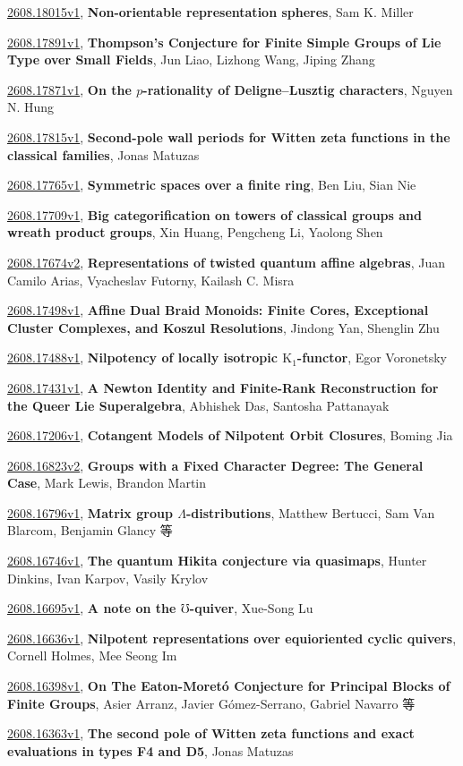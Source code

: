 \documentclass[9pt, a4paper]{article}
\theoremstyle{plain}
\theoremstyle{definition}
\theoremstyle{remark}
\newcommand{\arxiv}[3]{\href{https://arxiv.org/abs/#1}{#1}, \textbf{\textcolor{arxivblue}{#2}}, #3}
\begin{document}
\arxiv{2608.18015v1}{Non-orientable representation spheres}{Sam K. Miller}

\arxiv{2608.17891v1}{Thompson's Conjecture for Finite Simple Groups of Lie Type over Small Fields}{Jun Liao, Lizhong Wang, Jiping Zhang}

\arxiv{2608.17871v1}{On the $p$-rationality of Deligne--Lusztig characters}{Nguyen N. Hung}

\arxiv{2608.17815v1}{Second-pole wall periods for Witten zeta functions in the classical families}{Jonas Matuzas}

\arxiv{2608.17765v1}{Symmetric spaces over a finite ring}{Ben Liu, Sian Nie}

\arxiv{2608.17709v1}{Big categorification on towers of classical groups and wreath product groups}{Xin Huang, Pengcheng Li, Yaolong Shen}

\arxiv{2608.17674v2}{Representations of twisted quantum affine algebras}{Juan Camilo Arias, Vyacheslav Futorny, Kailash C. Misra}

\arxiv{2608.17498v1}{Affine Dual Braid Monoids: Finite Cores, Exceptional Cluster Complexes, and Koszul Resolutions}{Jindong Yan, Shenglin Zhu}

\arxiv{2608.17488v1}{Nilpotency of locally isotropic $ \mathrm{K}_1 $-functor}{Egor Voronetsky}

\arxiv{2608.17431v1}{A Newton Identity and Finite-Rank Reconstruction for the Queer Lie Superalgebra}{Abhishek Das, Santosha Pattanayak}

\arxiv{2608.17206v1}{Cotangent Models of Nilpotent Orbit Closures}{Boming Jia}

\arxiv{2608.16823v2}{Groups with a Fixed Character Degree: The General Case}{Mark Lewis, Brandon Martin}

\arxiv{2608.16796v1}{Matrix group $Λ$-distributions}{Matthew Bertucci, Sam Van Blarcom, Benjamin Glancy 等}

\arxiv{2608.16746v1}{The quantum Hikita conjecture via quasimaps}{Hunter Dinkins, Ivan Karpov, Vasily Krylov}

\arxiv{2608.16695v1}{A note on the $\mho$-quiver}{Xue-Song Lu}

\arxiv{2608.16636v1}{Nilpotent representations over equioriented cyclic quivers}{Cornell Holmes, Mee Seong Im}

\arxiv{2608.16398v1}{On The Eaton-Moretó Conjecture for Principal Blocks of Finite Groups}{Asier Arranz, Javier Gómez-Serrano, Gabriel Navarro 等}

\arxiv{2608.16363v1}{The second pole of Witten zeta functions and exact evaluations in types F4 and D5}{Jonas Matuzas}
\end{document}
